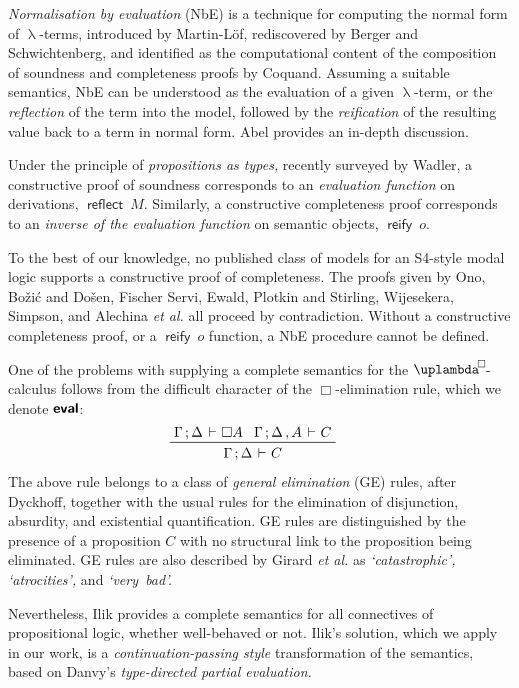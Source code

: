 \documentclass[submission,copyright,creativecommons,sharealike,backref=page]{eptcs}
\newcommand{\uplambdabox}{\uplambda^{\mkern-3mu\Box\mkern-3mu}}
\renewcommand{\:}{\mathop{\mkern3mu:\mkern3mu}}
\renewcommand{\.}{\mathop{\mkern3mu.\mkern3mu}}
\renewcommand{\;}{\mathop{;}}
\renewcommand{\,}{\mathop{,}}
\newcommand{\e}{\mathrel{\mkern2mu\vdash\mkern1mu}}
\newcommand{\reflect}{\operatorname{\textsf{reflect}}}
\newcommand{\reify}{\operatorname{\textsf{reify}}}
\newcommand{\eval}{\operatorname{\textsf{\textbf{eval}}}}
\theoremstyle{mystyle}
\begin{document}
\emph{Normalisation by evaluation} (NbE) is a technique for computing the normal form of $\uplambda$-terms, introduced by Martin-L{\"o}f\cite{MartinLof75}, rediscovered by Berger and Schwichtenberg\cite{BergerS91}, and identified as the computational content of the composition of soundness and completeness proofs by Coquand\cite{Coquand93}.  Assuming a suitable semantics, NbE can be understood as the evaluation of a given $\uplambda$-term, or the \emph{reflection} of the term into the model, followed by the \emph{reification} of the resulting value back to a term in normal form.  Abel\cite{Abel13} provides an in-depth discussion.

Under the principle of \emph{propositions as types,} recently surveyed by Wadler\cite{Wadler15}, a constructive proof of soundness corresponds to an \emph{evaluation function} on derivations, $\reflect~M$.  Similarly, a constructive completeness proof corresponds to an \emph{inverse of the evaluation function} on semantic objects, $\reify~o$.

To the best of our knowledge, no published class of models for an S4-style modal logic supports a constructive proof of completeness.  The proofs given by Ono\cite{Ono77}, Bo\v{z}i\'{c} and Do\v{s}en\cite{BozicD84}, Fischer Servi\cite{FischerServi84}, Ewald\cite{Ewald86}, Plotkin and Stirling\cite{PlotkinS86}, Wijesekera\cite{Wijesekera90}, Simpson\cite{Simpson94}, and Alechina \emph{et al.}\cite{AlechinaMPR01} all proceed by contradiction.  Without a constructive completeness proof, or a $\reify~o$ function, a NbE procedure cannot be defined.

One of the problems with supplying a complete semantics for the $\uplambdabox$-calculus follows from the difficult character of the $\Box$-elimination rule, which we denote $\eval$:
\begin{align*}
  & \prftree
     {\Gamma \; \Delta \e \Box A}{\Gamma \; \Delta \, A \e C}
     {\Gamma \; \Delta \e C}
\end{align*}
The above rule belongs to a class of \emph{general elimination} (GE) rules, after Dyckhoff\cite{Dyckhoff16}, together with the usual rules for the elimination of disjunction, absurdity, and existential quantification.  GE rules are distinguished by the presence of a proposition $C$ with no structural link to the proposition being eliminated.  GE rules are also described by Girard \emph{et al.}\cite{GirardTL89} as \textsl{`catastrophic', `atrocities',} and \textsl{`very~bad'.}

Nevertheless, Ilik\cite{Ilik13} provides a complete semantics for all connectives of propositional logic, whether well-behaved or not.  Ilik's solution, which we apply in our work, is a \emph{continuation-passing style} transformation of the semantics, based on Danvy's\cite{Danvy96} \emph{type-directed partial evaluation.}
\end{document}
